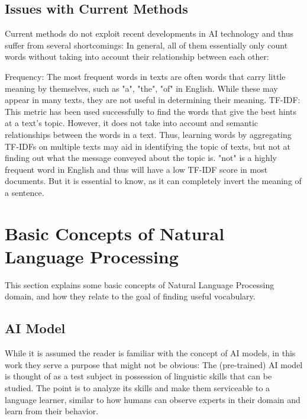 \subsection{Issues with Current Methods}
Current methods do not exploit recent developments in AI technology and thus suffer from several shortcomings:
In general, all of them essentially only count words without taking into account their relationship between each other:

Frequency: The most frequent words in texts are often words that carry little meaning by themselves, such as "a", "the", "of" in English.
While these may appear in many texts, they are not useful in determining their meaning.
TF-IDF: This metric has been used successfully to find the words that give the best hints at a text's topic.
However, it does not take into account and semantic relationships between the words in a text.
Thus, learning words by aggregating TF-IDFs on multiple texts may aid in identifying the topic of texts, but not at finding out what the message conveyed about the topic is.
"not" is a highly frequent word in English and thus will have a low TF-IDF score in most documents. But it is essential to know, as it can completely invert the meaning of a sentence.

\section{Basic Concepts of Natural Language Processing} \label{sec:basic-nlp-concepts}
This section explains some basic concepts of Natural Language Processing domain, and how they relate to the goal of finding useful vocabulary.


	\subsection {AI Model}
	      While it is assumed the reader is familiar with the concept of AI models, in this work they serve a purpose that might not be obvious:
	      The (pre-trained) AI model is thought of as a test subject in possession of linguistic skills that can be studied.
	      The point is to analyze its skills and make them serviceable to a language learner, similar to how humans can observe experts in their domain and learn from their behavior.

